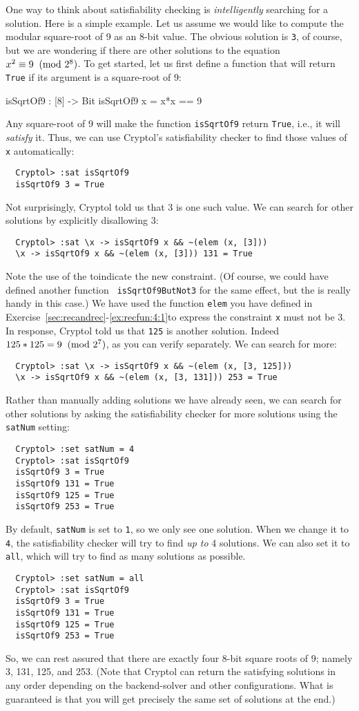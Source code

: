 One way to think about satisfiability checking is \emph{intelligently}
searching for a solution. Here is a simple example. Let us assume we
would like to compute the modular square-root of 9 as an 8-bit
value. The obvious solution is {\tt 3}, of course, but we are
wondering if there are other solutions to the equation $x^2 \equiv 9
\imod{2^8}$. To get started, let us first define a function that will
return {\tt True} if its argument is a square-root of 9:
\begin{code}
  isSqrtOf9 : [8] -> Bit
  isSqrtOf9 x = x*x == 9
\end{code}
Any square-root of 9 will make the function {\tt isSqrtOf9} return
{\tt True}, i.e., it will \emph{satisfy} it.  Thus, we can use
Cryptol's satisfiability checker to find those values of {\tt x}
automatically:
\begin{Verbatim}
  Cryptol> :sat isSqrtOf9 
  isSqrtOf9 3 = True
\end{Verbatim}
Not surprisingly, Cryptol told us that 3 is one such value. We can
search for other solutions by explicitly disallowing 3:
\begin{Verbatim}
  Cryptol> :sat \x -> isSqrtOf9 x && ~(elem (x, [3]))
  \x -> isSqrtOf9 x && ~(elem (x, [3])) 131 = True
\end{Verbatim}
Note the use of the \lamex to\indLamExp indicate the new
constraint. (Of course, we could have defined another function {\tt
  isSqrtOf9ButNot3} for the same effect, but the \lamex is really
handy in this case.) We have used the function {\tt elem} you have
defined in Exercise~\ref{sec:recandrec}-\ref{ex:recfun:4:1}\indElem to
express the constraint {\tt x} must not be 3. In response, Cryptol
told us that {\tt 125} is another solution. Indeed $125 * 125 =
9\imod{2^7}$, as you can verify separately.  We can search for more:
\begin{Verbatim}
  Cryptol> :sat \x -> isSqrtOf9 x && ~(elem (x, [3, 125]))
  \x -> isSqrtOf9 x && ~(elem (x, [3, 131])) 253 = True
\end{Verbatim}
Rather than manually adding solutions we have already seen, we can
search for other solutions by asking the satisfiability checker for
more solutions using the {\tt satNum} setting:
\begin{Verbatim}
  Cryptol> :set satNum = 4
  Cryptol> :sat isSqrtOf9
  isSqrtOf9 3 = True
  isSqrtOf9 131 = True
  isSqrtOf9 125 = True
  isSqrtOf9 253 = True
\end{Verbatim}
By default, {\tt satNum} is set to {\tt 1}, so we only see one
solution. When we change it to {\tt 4}, the satisfiability checker
will try to find \emph{up to} 4 solutions. We can also set it to {\tt
  all}, which will try to find as many solutions as possible.
\begin{Verbatim}
  Cryptol> :set satNum = all
  Cryptol> :sat isSqrtOf9
  isSqrtOf9 3 = True
  isSqrtOf9 131 = True
  isSqrtOf9 125 = True
  isSqrtOf9 253 = True
\end{Verbatim}
So, we can rest assured that there are exactly four 8-bit square roots
of 9; namely 3, 131, 125, and 253. (Note that Cryptol can return the
satisfying solutions in any order depending on the backend-solver and
other configurations. What is guaranteed is that you will get
precisely the same set of solutions at the end.)


